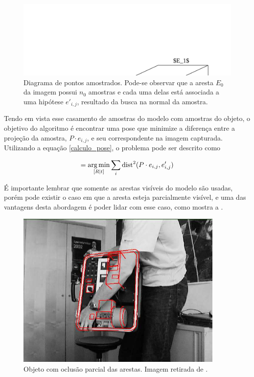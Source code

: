 \begin{figure}[!ht]
\centering\includegraphics{monografia/sample_point_diagram}
\caption{Diagrama de pontos amostrados. Pode-se observar que a aresta $E_0$ da imagem possui $n_0$ amostras e cada uma delas está associada a uma hipótese $e'_{i,j}$, resultado da busca na normal da amostra.}
\label{amostragem_de_pontos}
\end{figure}

Tendo em vista esse casamento de amostras do modelo com amostras do objeto, o objetivo do algoritmo é encontrar uma pose que minimize a diferença entre a projeção da amostra, $P \cdot e_{i,j}$, e seu correspondente na imagem capturada. Utilizando a equação \eqref{calculo_pose}, o problema pode ser descrito como

\begin{equation}
[R | t] = \argmin_{[R | t]} \sum_i \text{dist}^2(P \cdot e_{i,j}, e'_{i,j})
\label{calculo_pose_amostragem}
\end{equation}

É importante lembrar que somente as arestas visíveis do modelo são usadas, porém pode existir o caso em que a aresta esteja parcialmente visível, e uma das vantagens desta abordagem é poder lidar com esse caso, como mostra a .

\begin{figure}[ht!]
\centering
\includegraphics{monografia/occlusion.png}
\caption{Objeto com oclusão parcial das arestas. Imagem retirada de \cite{wuest}.}
\label{occlusion}
\end{figure}

